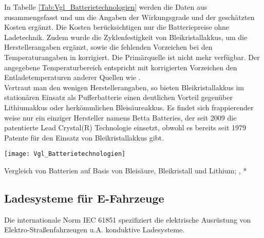 			In Tabelle \ref{Tab:Vgl_Batterietechnologien} werden die Daten aus \cite{Comparison_Batteries_2015} zusammengefasst und um die Angaben der Wirkungsgrade und der geschätzten Kosten ergänzt. Die Kosten berücksichtigen nur die Batteriepreise ohne Ladetechnik. Zudem wurde die Zyklenfestigkeit von Bleikristallakkus, um die Herstellerangaben ergänzt, sowie die fehlenden Vorzeichen bei den Temperaturangaben in \cite{Comparison_Batteries_2015} korrigiert. Die Primärquelle ist nicht mehr verfügbar. Der angegebene Temperaturbereich entspricht mit korrigierten Vorzeichen den Entladetemperaturen anderer Quellen wie \cite{BATTUni_Temperatur}.\\ 
			
			Vertraut man den wenigen Herstellerangaben, so bieten Bleikristallakkus im stationären Einsatz als Pufferbatterie einen deutlichen Vorteil gegenüber Lithiumakkus oder herkömmlichen Bleisäureakkus. Es findet sich frappierender weise nur ein einziger Hersteller namens Betta Batteries, der seit 2009 die patentierte Lead Crystal(R) Technologie einsetzt, obwohl es bereits seit 1979 Patente für den Einsatz von Bleikristallakkus gibt. \cite{patent1}\cite{patent2} 
			
			
			\begin{table}[h]
				\centering
				\texttt{[image: Vgl\_Batterietechnologien]}
				\caption{Vergleich von Batterien auf Basis von Bleisäure, Bleikristall und Lithium; \cite{Comparison_Batteries_2015}, *\cite[S.7]{AEE_ReNews_Strompseicher_2012}}
				\label{Tab:Vgl_Batterietechnologien}
			\end{table}

	
	\subsection{Ladesysteme für E-Fahrzeuge}
		\label{Kap:Ladesysteme}
		Die internationale Norm IEC 61851 spezifiziert die elektrische Ausrüstung von Elektro-Straßenfahrzeugen u.A. konduktive Ladesysteme. 
		
